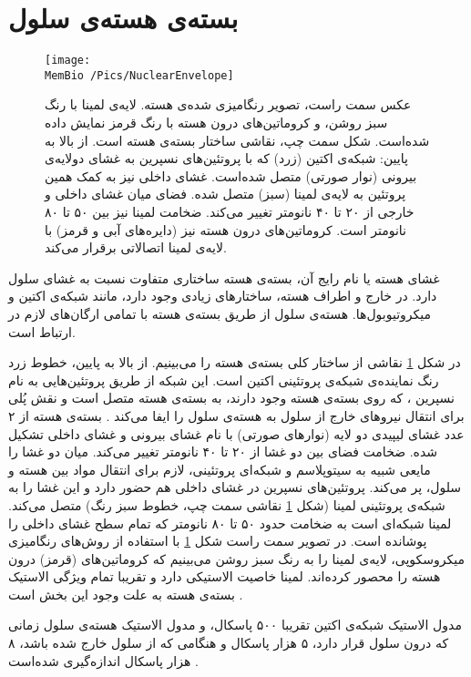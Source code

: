 \setRL


\section{\label{sec:nuclearenvelope}
بسته‌ی هسته‌ی سلول
}
\begin{figure}[h]
\begin{center}
\texttt{[image: \\MemBio /Pics/NuclearEnvelope]}
\caption{
عکس سمت راست، تصویر رنگامیزی شده‌ی هسته. لایه‌ی لمینا با رنگ سبز روشن، و کروماتین‌های درون هسته با رنگ قرمز نمایش داده‌ شده‌است. شکل سمت چپ، نقاشی ساختار بسته‌ی هسته است. از بالا به پایین: شبکه‌ی اکتین (زرد) که با پروتئین‌های نسپرین به غشای دولایه‌ی بیرونی (نوار صورتی) متصل شده‌است. غشای داخلی نیز به کمک همین پروتئین به لایه‌ی لمینا (سبز) متصل شده. فضای میان غشای داخلی و خارجی از ۲۰ تا ۴۰ نانومتر تغییر می‌کند. ضخامت لمینا نیز بین ۵۰ تا ۸۰ نانومتر است. کروماتین‌های درون هسته نیز (دایره‌های آبی و قرمز) با لایه‌ی لمینا اتصالاتی برقرار می‌کند. 
}
\label{fig:nuclearenvelope}
\end{center}
\end{figure}


غشای هسته یا نام رایج آن، بسته‌ی هسته
ساختاری متفاوت نسبت به غشای سلول دارد. در خارج و اطراف هسته، ساختارهای زیادی وجود دارد، مانند شبکه‌ی اکتین
 و میکروتیوبول‌ها.
 هسته‌ی سلول از طریق بسته‌ی هسته با تمامی‌ ارگان‌های لازم در ارتباط است.

در شکل 
\ref{fig:nuclearenvelope}
نقاشی از ساختار کلی بسته‌ی هسته را می‌بینیم. از بالا به پایین، خطوط زرد رنگ نماینده‌ی شبکه‌ی پروتئینی اکتین است. این شبکه از طریق پروتئین‌هایی به نام نسپرین
، که روی بسته‌ی هسته وجود دارند، به بسته‌ی هسته متصل است و نقش پُلی برای انتقال نیرو‌های خارج از سلول به هسته‌ی سلول را ایفا می‌کند
\cite{Lammerding2011}. بسته‌ی هسته از ۲ عدد غشای لیپیدی دو لایه (نوارهای صورتی) با نام غشای بیرونی و غشای داخلی تشکیل شده. ضخامت فضای بین دو غشا از ۲۰ تا ۴۰ نانومتر تغییر می‌کند. میان دو غشا را مایعی شبیه به سیتوپلاسم و شبکه‌ای پروتئینی، لازم برای انتقال مواد بین هسته و سلول، پر می‌کند. پروتئین‌های نسپرین  در غشای داخلی هم حضور دارد و این غشا را به شبکه‌ی پروتئینی لمینا
(شکل
\ref{fig:nuclearenvelope}
نقاشی سمت چپ، خطوط سبز‌ رنگ) متصل می‌کند. لمینا‌ شبکه‌ای است به ضخامت حدود ۵۰ تا ۸۰ نانومتر که تمام سطح غشای داخلی را پوشانده است. در تصویر سمت راست شکل 
\ref{fig:nuclearenvelope}
با استفاده از روش‌های رنگامیزی میکروسکوپی، لایه‌ی لمینا را به رنگ سبز روشن می‌بینیم که کروماتین‌های (قرمز) درون هسته را محصور کرده‌اند. لمینا خاصیت الاستیکی دارد و تقریبا تمام ویژگی الاستیک بسته‌ی هسته به علت وجود این بخش است
\cite{Steensel2017wd}.



مدول الاستیک شبکه‌ی اکتین تقریبا ۵۰۰ پاسکال، و مدول الاستیک هسته‌ی سلول زمانی که درون سلول قرار دارد، ۵ هزار پاسکال و هنگامی ‌که از سلول خارج شده باشد، ۸ هزار پاسکال اندازه‌گیری شده‌است
\cite{Dahl2004, CAILLE2002177}.







